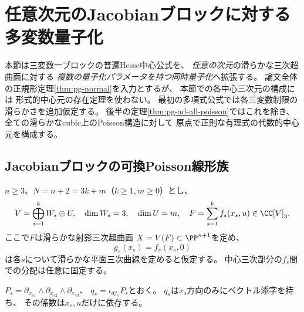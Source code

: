 \section{任意次元のJacobianブロックに対する多変数量子化}
\label{sec:pg-all-dimensions}
本節は三変数一ブロックの普遍Hesse中心公式を、
\emph{任意の次元}の滑らかな三次超曲面に対する
\emph{複数の量子化パラメータを持つ同時量子化}へ拡張する。
論文全体の正規形定理\ref{thm:pg-normal}を入力とするが、
本節での各中心三次元の構成には
形式的中心元の存在定理を使わない。
最初の多項式公式では各三変数制限の滑らかさを追加仮定する。
後半の定理\ref{thm:pg-ad-all-poisson}ではこれを除き、
全ての滑らかなcubic上のPoisson構造に対して
原点で正則な有理式の代数的中心元を構成する。

\subsection{Jacobianブロックの可換Poisson線形族}
$n\ge3$、$N=n+2=3k+m$（$k\ge1,m\ge0$）とし、
\begin{equation}
 V=\bigoplus_{s=1}^{k}W_s\oplus U,\quad
 \dim W_s=3,\quad\dim U=m,\quad
 F=\sum_{s=1}^k f_s(x_s,u)\in\CC[V]_3.
 \label{eq:pg-ad-normal}
\end{equation}
ここで$F$は滑らかな射影三次超曲面
$X=V(F)\subset\PP^{n+1}$を定め、
\begin{equation}
 g_s(x_s)=f_s(x_s,0)
 \label{eq:pg-ad-smooth}
\end{equation}
は各$s$について滑らかな平面三次曲線を定めると仮定する。
中心三次部分の$f_s$間での分配は任意に固定する。

$P_s=\partial_{x_{s1}}\wedge\partial_{x_{s2}}
\wedge\partial_{x_{s3}}$、
$q_s=\iota_{df_s}P_s$とおく。
$q_s$は$x_s$方向のみにベクトル添字を持ち、
その係数は$x_s,u$だけに依存する。

